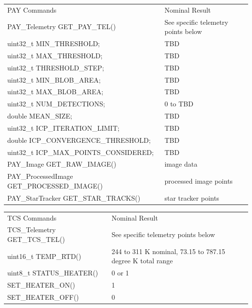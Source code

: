 \documentclass{article}
\begin{document}
\newpage
\begin{tabular}{|l|l|}
	\hline
	PAY Commands      &  Nominal Result                \\ \hhline{|=|=|}
	PAY_Telemetry GET_PAY_TEL() & See specific telemetry points below \\ \hline
	uint32_t MIN_THRESHOLD; & TBD \\ \hline
	uint32_t MAX_THRESHOLD; & TBD \\ \hline
	uint32_t THRESHOLD_STEP; & TBD \\ \hline
	uint32_t MIN_BLOB_AREA; & TBD \\ \hline
	uint32_t MAX_BLOB_AREA; & TBD \\ \hline
	uint32_t NUM_DETECTIONS; & 0 to TBD \\ \hline
	double MEAN_SIZE; & TBD \\ \hline
	uint32_t ICP_ITERATION_LIMIT; & TBD \\ \hline
	double ICP_CONVERGENCE_THRESHOLD; & TBD \\ \hline
	uint32_t ICP_MAX_POINTS_CONSIDERED; & TBD \\ \hline
	PAY_Image GET_RAW_IMAGE() & image data \\ \hline
	PAY_ProcessedImage GET_PROCESSED_IMAGE() & processed image points \\ \hline
	PAY_StarTracker GET_STAR_TRACKS() & star tracker points \\ \hline
\end{tabular}

\newpage
\begin{tabular}{|l|l|}
	\hline
	TCS Commands      &  Nominal Result                \\ \hhline{|=|=|}
	TCS_Telemetry GET_TCS_TEL() & See specific telemetry points below \\ \hline
	uint16_t TEMP_RTD() & 244 to 311 K nominal, 73.15 to 787.15 degree K total range \\ \hline
	uint8_t STATUS_HEATER() & 0 or 1 \\ \hline
	SET_HEATER_ON() & 1 \\ \hline
	SET_HEATER_OFF() & 0 \\ \hline
\end{tabular}
\end{document}
